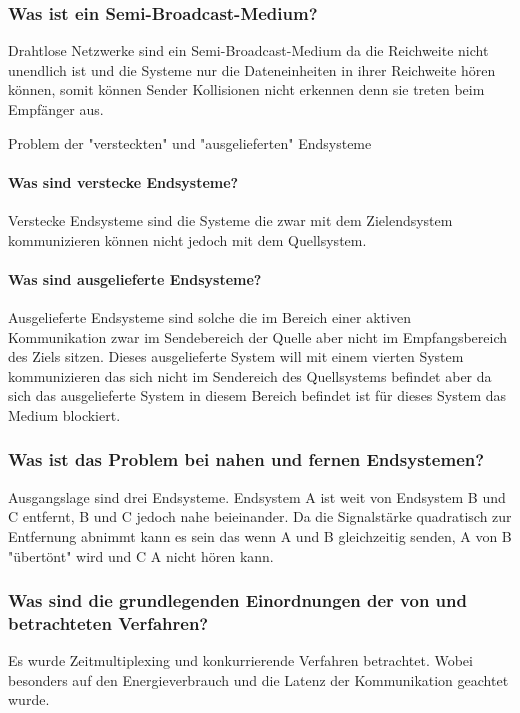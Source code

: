 	\subsubsection{Was ist ein Semi-Broadcast-Medium?}
	Drahtlose Netzwerke sind ein Semi-Broadcast-Medium da die Reichweite nicht unendlich ist und die Systeme nur die Dateneinheiten in ihrer Reichweite hören können, somit können Sender Kollisionen nicht erkennen denn sie treten beim Empfänger aus.
	
	Problem der "versteckten" und "ausgelieferten" Endsysteme
	
	\paragraph{Was sind verstecke Endsysteme?}
	Verstecke Endsysteme sind die Systeme die zwar mit dem Zielendsystem kommunizieren können nicht jedoch mit dem Quellsystem.
	
	\paragraph{Was sind ausgelieferte Endsysteme?}
	Ausgelieferte Endsysteme sind solche die im Bereich einer aktiven Kommunikation zwar im Sendebereich der Quelle aber nicht im Empfangsbereich des Ziels sitzen. Dieses ausgelieferte System will mit einem vierten System kommunizieren das sich nicht im Sendereich des Quellsystems befindet aber da sich das ausgelieferte System in diesem Bereich befindet ist für dieses System das Medium blockiert.  
	
	\subsubsection{Was ist das Problem bei nahen und fernen Endsystemen?}
	Ausgangslage sind drei Endsysteme. Endsystem A ist weit von Endsystem B und C entfernt, B und C jedoch nahe beieinander.
	Da die Signalstärke quadratisch zur Entfernung abnimmt kann es sein das wenn A und B gleichzeitig senden, A von B "übertönt" wird und C A nicht hören kann.
	
	\subsubsection{Was sind die grundlegenden Einordnungen der von und betrachteten Verfahren?}
	Es wurde Zeitmultiplexing und konkurrierende Verfahren betrachtet. Wobei besonders auf den Energieverbrauch und die Latenz der Kommunikation geachtet wurde.
	
